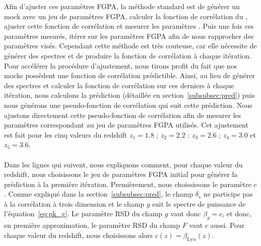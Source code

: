Afin d'ajuster ces paramètres FGPA, la méthode standard est de générer un mock avec un jeu de paramètres FGPA, calculer la fonction de corrélation du \lya{}, ajuster cette fonction de corrélation et mesurer les paramètres \lya{}. Puis une fois ces paramètres mesurés, itérer sur les paramètres FGPA afin de nous rapprocher des paramètres \lya{} visés. Cependant cette méthode est très couteuse, car elle nécessite de générer des spectres et de produire la fonction de corrélation à chaque itération.
Pour accélérer la procédure d'ajustement, nous tirons profit du fait que nos mocks possèdent une fonction de corrélation prédictible.
Ainsi, au lieu de générer des spectres et calculer la fonction de corrélation sur ces derniers à chaque itération, nous calculons la prédiction (détaillée en section~\ref{subsubsec:pred}) puis nous générons une pseudo-fonction de corrélation qui suit cette prédiction. Nous ajustons directement cette pseudo-fonction de corrélation afin de mesurer les paramètres \lya{} correspondant au jeu de paramètres FGPA utilisés.
Cet ajustement est fait pour les cinq valeurs du redshift $z_1 = \num{1.8}$ ; $z_2 = \num{2.2}$ ; $z_3 = \num{2.6}$ ; $z_4 = \num{3.0}$ et $z_5 = \num{3.6}$.

\paragraph{}
Dans les lignes qui suivent, nous expliquons comment, pour chaque valeur du redshift, nous choisissons le jeu de paramètres FGPA initial pour générer la prédiction à la première itération.
Premièrement, nous choississons le paramètre $c$.
Comme expliqué dans la section~\ref{subsubsec:pred}, le champ $\delta_s$ ne participe pas à la corrélation à trois dimension et le champ $g$ suit le spectre de puissance de l'équation~\ref{eq:pk_g}. Le paramètre RSD du champ $g$ vaut donc $\beta_g = c$, et donc, en première approximation, le paramètre RSD du champ $F$ vaut $c$ aussi. Pour chaque valeur du redshift, nous choisissons alors $c(z) = \beta_{\mathrm{Ly}\alpha}(z)$.


